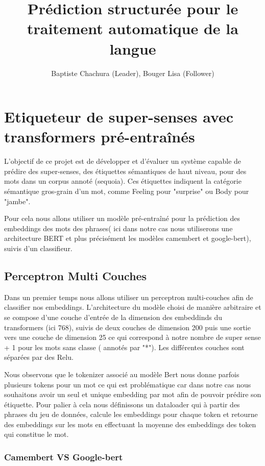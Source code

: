 \documentclass[12pt]{article}
\title{Prédiction structurée pour le traitement automatique de la langue}
\author{Baptiste Chachura (Leader), Bouger Lisa (Follower)}
\begin{document}
\maketitle

\vspace{0.5in}

\tableofcontents %
\newpage


\section{Etiqueteur de super-senses avec transformers pré-entraînés}

L’objectif de ce projet est de développer et d’évaluer un système capable de prédire des super-senses, des étiquettes sémantiques 
de haut niveau, pour des mots dans un corpus annoté (sequoia). Ces étiquettes indiquent la catégorie sémantique gros-grain d’un mot,
comme Feeling pour "surprise" ou Body pour "jambe".

Pour cela nous allons utiliser un modèle pré-entraîné pour la prédiction des embeddings des mots des phrases( ici dans notre cas 
nous utiliserons une architecture BERT et plus précisément les modèles camembert et google-bert), suivis d'un classifieur.
\subsection{Perceptron Multi Couches}
Dans un premier temps nous allons utiliser un perceptron multi-couches afin de classifier nos embeddings. L'architecture du modèle choisi
de manière arbitraire et se compose d'une couche d'entrée de la dimension des embeddinds du transformers (ici 768), suivis de deux couches 
de dimension 200 puis une sortie vers une couche de dimension 25 ce qui correspond à notre nombre de super sense + 1 pour les mots sans classe ( annotés par "*"). 
Les différentes couches sont séparées par des Relu.

Nous observons que le tokenizer associé au modèle Bert nous donne parfois plusieurs tokens pour un mot ce qui est problématique car 
dans notre cas nous souhaitons avoir un seul et unique embedding par mot afin de pouvoir prédire son étiquette. Pour palier à cela nous
définissons un dataloader qui à partir des phrases du jeu de données, calcule les embeddings pour chaque token et retourne des embeddings sur les mots en effectuant la 
moyenne des embeddings des token qui constitue le mot.
\subsubsection{Camembert VS Google-bert}
\end{document}
